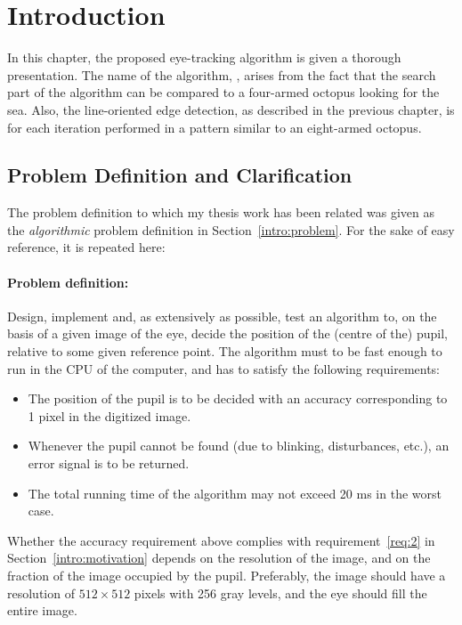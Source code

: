 
\section{Introduction}
\label{algo:intro}

In this chapter, the proposed eye-tracking algorithm is given a
thorough presentation.  The name of the algorithm, {\octopus}, arises
from the fact that the search part of the algorithm can be compared to
a four-armed octopus looking for the sea.  Also, the line-oriented
edge detection, as described in the previous chapter, is for each
iteration performed in a pattern similar to an eight-armed octopus.

\subsection{Problem Definition and Clarification}
\label{algo:intro:problem}

The problem definition to which my thesis work has been related was
given as the {\em algorithmic\/} problem definition in
Section~\ref{intro:problem}.  For the sake of easy reference, it is
repeated here:

\paragraph{Problem definition:}
Design, implement and, as extensively as possible, test an algorithm
to, on the basis of a given image of the eye, decide the position of
the (centre of the) pupil, relative to some given reference point.
The algorithm must to be fast enough to run in the CPU of the
computer, and has to satisfy the following requirements:
\begin{itemize}
\item The position of the pupil is to be decided with an accuracy
  corresponding to 1 pixel in the digitized image.
\item Whenever the pupil cannot be found (due to blinking,
  disturbances, etc.), an error signal is to be returned.
\item The total running time of the algorithm may not exceed 20 ms in
  the worst case.
\end{itemize}
Whether the accuracy requirement above complies with
requirement~\ref{req:2} in Section~\ref{intro:motivation} depends on
the resolution of the image, and on the fraction of the image occupied
by the pupil.  Preferably, the image should have a resolution of
$512\times 512$ pixels with 256 gray levels, and the eye should fill
the entire image.
\vspace*{0.5cm}


